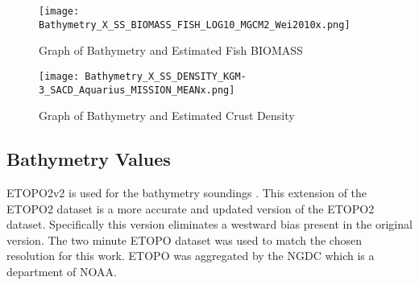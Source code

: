 
\begin{figure}[h]
    \centering
    \texttt{[image: Bathymetry\_X\_SS\_BIOMASS\_FISH\_LOG10\_MGCM2\_Wei2010x.png]}
    \caption{Graph of Bathymetry and Estimated Fish BIOMASS}
    \label{fig:bathyxfish}
\end{figure}


\begin{figure}[h]
    \centering
    \texttt{[image: Bathymetry\_X\_SS\_DENSITY\_KGM-3\_SACD\_Aquarius\_MISSION\_MEANx.png]}
    \caption{Graph of Bathymetry and Estimated Crust Density}
    \label{fig:bathyxdensity}
\end{figure}



\subsection{Bathymetry Values}
ETOPO2v2 is used for the bathymetry soundings \cite{national20062}.
This extension of the ETOPO2 dataset \cite{national1988etopo} is a more accurate and updated version of the ETOPO2 dataset.
Specifically this version eliminates a westward bias present in the original version.
The two minute \ac{ETOPO} dataset was used to match the chosen resolution for this work.
\ac{ETOPO} was aggregated by the \ac{NGDC} which is a department of \ac{NOAA}.


